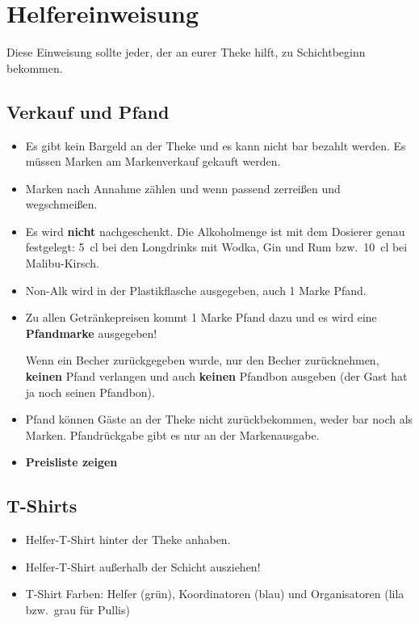 \section{Helfereinweisung}
Diese Einweisung sollte jeder, der an eurer Theke hilft, zu Schichtbeginn bekommen.
\subsection{Verkauf und Pfand}
\begin{itemize}
  \renewcommand{\labelitemi}{$\Box$}
  \item Es gibt kein Bargeld an der Theke und es kann nicht bar bezahlt werden. Es müssen Marken am Markenverkauf gekauft werden.
  \item Marken nach Annahme zählen und wenn passend zerreißen und wegschmeißen.
  \item Es wird \textbf{nicht} nachgeschenkt. Die Alkoholmenge ist mit dem Dosierer genau festgelegt: \SI{5}{\centi\litre} bei den Longdrinks mit Wodka, Gin und Rum bzw.\ \SI{10}{\centi\litre} bei Malibu-Kirsch.
  \item Non-Alk wird in der Plastikflasche ausgegeben, auch 1 Marke Pfand.
  \item Zu allen Getränkepreisen kommt 1 Marke Pfand dazu und es wird eine \textbf{Pfandmarke} ausgegeben!
    
    Wenn ein Becher zurückgegeben wurde, nur den Becher zurücknehmen, \textbf{keinen} Pfand verlangen und auch \textbf{keinen} Pfandbon ausgeben (der Gast hat ja noch seinen Pfandbon).
  \item Pfand können Gäste an der Theke nicht zurückbekommen, weder bar noch als Marken. Pfandrückgabe gibt es nur an der Markenausgabe.
  \item \textbf{Preisliste zeigen}
\end{itemize}
\subsection{T-Shirts}
\begin{itemize}
  \renewcommand{\labelitemi}{$\Box$}
  \item Helfer-T-Shirt hinter der Theke anhaben.
  \item Helfer-T-Shirt außerhalb der Schicht ausziehen!
  \item T-Shirt Farben: Helfer (grün), Koordinatoren (blau) und Organisatoren (lila bzw.\ grau für Pullis)
\end{itemize}
